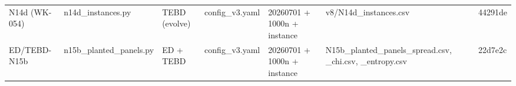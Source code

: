 \begin{table}[tb]
\begin{ruledtabular}
\begin{tabular}{lllllll}
\parbox[t]{0.08\textwidth}{\raggedright N14d (WK-054)\strut} & \parbox[t]{0.15\textwidth}{\raggedright n14d\_instances.py\strut} & \parbox[t]{0.10\textwidth}{\raggedright TEBD (evolve)\strut} & \parbox[t]{0.09\textwidth}{\raggedright config\_v3.yaml\strut} & \parbox[t]{0.15\textwidth}{\raggedright 20260701 + 1000n + instance\strut} & \parbox[t]{0.20\textwidth}{\raggedright v8/N14d\_instances.csv\strut} & 44291de \\[4pt]
\parbox[t]{0.08\textwidth}{\raggedright ED/TEBD-N15b\strut} & \parbox[t]{0.15\textwidth}{\raggedright n15b\_planted\_panels.py\strut} & \parbox[t]{0.10\textwidth}{\raggedright ED + TEBD\strut} & \parbox[t]{0.09\textwidth}{\raggedright config\_v3.yaml\strut} & \parbox[t]{0.15\textwidth}{\raggedright 20260701 + 1000n + instance\strut} & \parbox[t]{0.20\textwidth}{\raggedright N15b\_planted\_panels\_spread.csv, \_chi.csv, \_entropy.csv\strut} & 22d7e2c \\
\end{tabular}
\end{ruledtabular}
\end{table}
